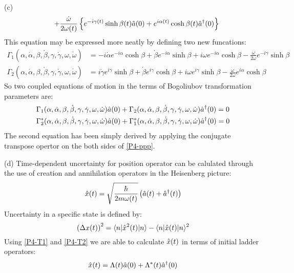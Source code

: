 \begin{homeworkProblem}
\begin{homeworkSection}{(c)}
\begin{eqnarray}
& &+\frac{\dot{\omega}}{2\omega(t)}\left\{e^{-i\gamma(t)}\sinh\beta(t)\Hat{a}(0)+e^{i\alpha(t)}\cosh\beta(t)\Hat{a}^\dagger(0)\right\}
\label{P4-ppp}
\end{eqnarray}
This equation may be expressed more neatly by defining two new funcations:
\begin{align}
\Gamma_1(\alpha,\dot{\alpha},\beta,\dot{\beta},\gamma,\dot{\gamma},\omega,\dot{\omega})&=-i\dot{\alpha}e^{-i\alpha}\cosh\beta+\dot{\beta}e^{-i\alpha}\sinh\beta+
i\omega e^{-i\alpha}\cosh\beta-\frac{\dot{\omega}}{2\omega}e^{-i\gamma}\sinh\beta\\
\Gamma_2(\alpha,\dot{\alpha},\beta,\dot{\beta},\gamma,\dot{\gamma},\omega,\dot{\omega})&=i\dot{\gamma}e^{i\gamma }\sinh\beta+\dot{\beta}e^{i\gamma}\cosh\beta
+i\omega e^{i\gamma}\sinh\beta-\frac{\dot{\omega}}{2\omega}e^{i\alpha}\cosh\beta
\end{align}
So two coupled equations of motion in the terms of Bogoliubov transformation parameters are:
\begin{align}
&\Gamma_1(\alpha,\dot{\alpha},\beta,\dot{\beta},\gamma,\dot{\gamma},\omega,\dot{\omega})\Hat{a}(0)+\Gamma_2(\alpha,\dot{\alpha},\beta,\dot{\beta},\gamma,\dot{\gamma},\omega,\dot{\omega})\Hat{a}^\dagger(0)=0\\
&\Gamma_2^*(\alpha,\dot{\alpha},\beta,\dot{\beta},\gamma,\dot{\gamma},\omega,\dot{\omega})\Hat{a}(0)+\Gamma_1^*(\alpha,\dot{\alpha},\beta,\dot{\beta},\gamma,\dot{\gamma},\omega,\dot{\omega})\Hat{a}^\dagger(0)=0
\end{align}
The second equation has been simply derived by applying the conjugate transpose opertor on the both sides of \eqref{P4-ppp}.
\end{homeworkSection}
\begin{homeworkSection}{(d)}
Time-dependent uncertainty for position operator can be calulated through the use of creation and annihilation operators in the Heisenberg picture:
\begin{equation}
\Hat{x}(t)=\sqrt{\frac{\hbar}{2m\omega(t)}}\left(\Hat{a}(t)+\Hat{a}^\dagger(t)\right)
\end{equation}
Uncertainty in a specific state is defined by:
\begin{equation}\label{P4-220}
\left(\Delta x(t)\right)^2=\langle n|\Hat{x}^2(t)|n\rangle-\langle n|\Hat{x}(t)|n\rangle^2
\end{equation}
Using \eqref{P4-T1} and \eqref{P4-T2} we are able to calculate $\Hat{x}(t)$ in terms of initial ladder operators:
\begin{equation}
\A{x}(t)=\Lambda(t)\A{a}(0)+\Lambda^*(t)\A{a}^\dagger(0)

\end{equation}
\end{homeworkSection}
\end{homeworkProblem}
